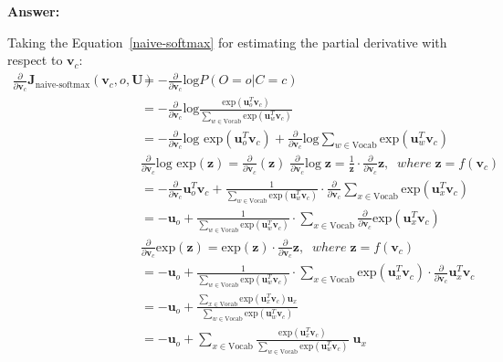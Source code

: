 \documentclass{article}
\newenvironment{answer}{
    {\bf Answer:} \sf \begingroup\color{red}
}{\endgroup}%
\begin{document}
\begin{enumerate}[label=(\alph*)]
\begin{shaded}
\begin{answer}
Taking the Equation~\ref{naive-softmax} for estimating the partial derivative with respect to $\bm v_c$: 
\begin{equation*}
\begin{split}
\frac{\partial}{\partial \bm v_c} \bm J_{\text{naive-softmax}}(\bm v_c, o, \bm U) & = - \frac{\partial}{\partial \bm v_c} \text{log} P(O=o|C=c)\\
 & = - \frac{\partial}{\partial \bm v_c} \text{log} \frac{\text{exp}(\bm u_o^T \bm v_c)}{\sum_{w \in \text{Vocab}}\text{exp}( \bm  u_w^T \bm v_c)}\\
 & = - \frac{\partial}{\partial \bm v_c} \text{log exp} (\bm u_o^T \bm v_c) + \frac{\partial}{\partial \bm v_c} \text{log} \sum_{w \in \text{Vocab}} \text{exp} (\bm  u_w^T \bm v_c)\\
 & \boxed{ \frac{\partial}{\partial \bm v_c} \text{log exp} (\bm z) =  \frac{\partial}{\partial \bm v_c} (\bm z)} \; \boxed{ \frac{\partial}{\partial \bm v_c} \text{log} \;\bm z = \frac{1}{\bm z} \cdot \frac{\partial}{\partial \bm v_c} \bm z , \;\; where \; \bm z = f(\bm v_c)}\\
 & = - \frac{\partial}{\partial \bm v_c} \bm u_o^T\bm v_c + \frac{1}{\sum_{w \in \text{Vocab}} \text{exp} (\bm  u_w^T \bm v_c)} \cdot \frac{\partial}{\partial \bm v_c} \sum_{x \in \text{Vocab}} \text{exp} (\bm  u_x^T \bm v_c)\\
 & = - \bm u_o + \frac{1}{\sum_{w \in \text{Vocab}} \text{exp} (\bm  u_w^T \bm v_c)} \cdot \sum_{x \in \text{Vocab}} \frac{\partial}{\partial \bm v_c} \text{exp} (\bm  u_x^T \bm v_c)\\
 & \boxed{ \frac{\partial}{\partial \bm v_c} \text{exp} (\bm z) = \text{exp} (\bm z) \cdot \frac{\partial}{\partial \bm v_c} \bm z , \;\; where \; \bm z = f(\bm v_c)}\\
 & = - \bm u_o + \frac{1}{\sum_{w \in \text{Vocab}} \text{exp} (\bm  u_w^T \bm v_c)} \cdot \sum_{x \in \text{Vocab}} \text{exp} (\bm  u_x^T \bm v_c) \cdot \frac{\partial}{\partial \bm v_c} \bm  u_x^T \bm v_c\\
 & = - \bm u_o + \frac{\sum_{x \in \text{Vocab}} \text{exp} (\bm  u_x^T \bm v_c) \bm u_x}{\sum_{w \in \text{Vocab}} \text{exp} (\bm  u_w^T \bm v_c)}\\
 & = - \bm u_o + \sum_{x \in \text{Vocab}} \frac{ \text{exp} (\bm  u_x^T \bm v_c)}{\sum_{w \in \text{Vocab}} \text{exp} (\bm  u_w^T \bm v_c)} \; \bm u_x
\end{split}
\end{equation*}


\end{answer}
\end{shaded}
\end{enumerate}
\end{document}
